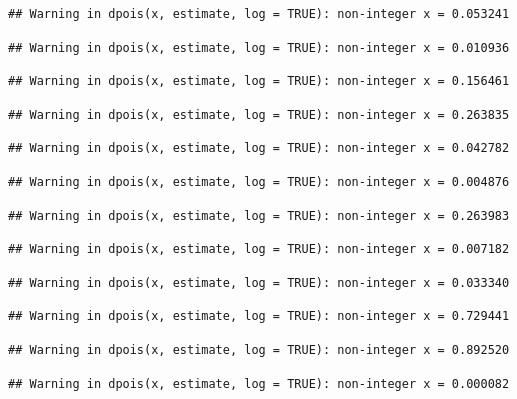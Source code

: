 \documentclass[]{article}
\begin{document}
\begin{verbatim}
## Warning in dpois(x, estimate, log = TRUE): non-integer x = 0.053241
\end{verbatim}

\begin{verbatim}
## Warning in dpois(x, estimate, log = TRUE): non-integer x = 0.010936
\end{verbatim}

\begin{verbatim}
## Warning in dpois(x, estimate, log = TRUE): non-integer x = 0.156461
\end{verbatim}

\begin{verbatim}
## Warning in dpois(x, estimate, log = TRUE): non-integer x = 0.263835
\end{verbatim}

\begin{verbatim}
## Warning in dpois(x, estimate, log = TRUE): non-integer x = 0.042782
\end{verbatim}

\begin{verbatim}
## Warning in dpois(x, estimate, log = TRUE): non-integer x = 0.004876
\end{verbatim}

\begin{verbatim}
## Warning in dpois(x, estimate, log = TRUE): non-integer x = 0.263983
\end{verbatim}

\begin{verbatim}
## Warning in dpois(x, estimate, log = TRUE): non-integer x = 0.007182
\end{verbatim}

\begin{verbatim}
## Warning in dpois(x, estimate, log = TRUE): non-integer x = 0.033340
\end{verbatim}

\begin{verbatim}
## Warning in dpois(x, estimate, log = TRUE): non-integer x = 0.729441
\end{verbatim}

\begin{verbatim}
## Warning in dpois(x, estimate, log = TRUE): non-integer x = 0.892520
\end{verbatim}

\begin{verbatim}
## Warning in dpois(x, estimate, log = TRUE): non-integer x = 0.000082
\end{verbatim}
\end{document}
